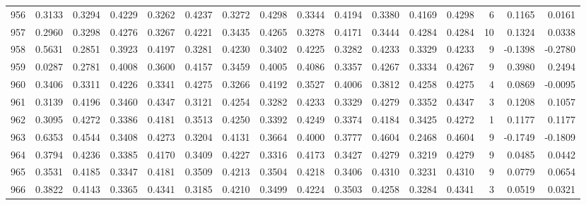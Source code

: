 \begin{tabular}{lrrrrrrrrrrrrrrr}
956 &      0.3133 &  0.3294 &  0.4229 &  0.3262 &  0.4237 &  0.3272 &  0.4298 &  0.3344 &  0.4194 &  0.3380 &   0.4169 &     0.4298 &      6 &                    0.1165 &                     0.0161 \\
957 &      0.2960 &  0.3298 &  0.4276 &  0.3267 &  0.4221 &  0.3435 &  0.4265 &  0.3278 &  0.4171 &  0.3444 &   0.4284 &     0.4284 &     10 &                    0.1324 &                     0.0338 \\
958 &      0.5631 &  0.2851 &  0.3923 &  0.4197 &  0.3281 &  0.4230 &  0.3402 &  0.4225 &  0.3282 &  0.4233 &   0.3329 &     0.4233 &      9 &                   -0.1398 &                    -0.2780 \\
959 &      0.0287 &  0.2781 &  0.4008 &  0.3600 &  0.4157 &  0.3459 &  0.4005 &  0.4086 &  0.3357 &  0.4267 &   0.3334 &     0.4267 &      9 &                    0.3980 &                     0.2494 \\
960 &      0.3406 &  0.3311 &  0.4226 &  0.3341 &  0.4275 &  0.3266 &  0.4192 &  0.3527 &  0.4006 &  0.3812 &   0.4258 &     0.4275 &      4 &                    0.0869 &                    -0.0095 \\
961 &      0.3139 &  0.4196 &  0.3460 &  0.4347 &  0.3121 &  0.4254 &  0.3282 &  0.4233 &  0.3329 &  0.4279 &   0.3352 &     0.4347 &      3 &                    0.1208 &                     0.1057 \\
962 &      0.3095 &  0.4272 &  0.3386 &  0.4181 &  0.3513 &  0.4250 &  0.3392 &  0.4249 &  0.3374 &  0.4184 &   0.3425 &     0.4272 &      1 &                    0.1177 &                     0.1177 \\
963 &      0.6353 &  0.4544 &  0.3408 &  0.4273 &  0.3204 &  0.4131 &  0.3664 &  0.4000 &  0.3777 &  0.4604 &   0.2468 &     0.4604 &      9 &                   -0.1749 &                    -0.1809 \\
964 &      0.3794 &  0.4236 &  0.3385 &  0.4170 &  0.3409 &  0.4227 &  0.3316 &  0.4173 &  0.3427 &  0.4279 &   0.3219 &     0.4279 &      9 &                    0.0485 &                     0.0442 \\
965 &      0.3531 &  0.4185 &  0.3347 &  0.4181 &  0.3509 &  0.4213 &  0.3504 &  0.4218 &  0.3406 &  0.4310 &   0.3231 &     0.4310 &      9 &                    0.0779 &                     0.0654 \\
966 &      0.3822 &  0.4143 &  0.3365 &  0.4341 &  0.3185 &  0.4210 &  0.3499 &  0.4224 &  0.3503 &  0.4258 &   0.3284 &     0.4341 &      3 &                    0.0519 &                     0.0321 \\

\end{tabular}
